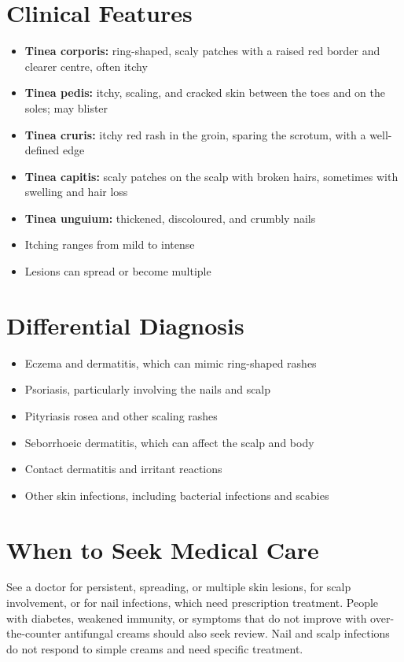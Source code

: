 \section*{Clinical Features}
\begin{itemize}
    \item \textbf{Tinea corporis:} ring-shaped, scaly patches with a raised red border and clearer centre, often itchy
    \item \textbf{Tinea pedis:} itchy, scaling, and cracked skin between the toes and on the soles; may blister
    \item \textbf{Tinea cruris:} itchy red rash in the groin, sparing the scrotum, with a well-defined edge
    \item \textbf{Tinea capitis:} scaly patches on the scalp with broken hairs, sometimes with swelling and hair loss
    \item \textbf{Tinea unguium:} thickened, discoloured, and crumbly nails
    \item Itching ranges from mild to intense
    \item Lesions can spread or become multiple
\end{itemize}

\section*{Differential Diagnosis}
\begin{itemize}
    \item Eczema and dermatitis, which can mimic ring-shaped rashes
    \item Psoriasis, particularly involving the nails and scalp
    \item Pityriasis rosea and other scaling rashes
    \item Seborrhoeic dermatitis, which can affect the scalp and body
    \item Contact dermatitis and irritant reactions
    \item Other skin infections, including bacterial infections and scabies
\end{itemize}

\section*{When to Seek Medical Care}
See a doctor for persistent, spreading, or multiple skin lesions, for scalp involvement, or for nail infections, which need prescription treatment. People with diabetes, weakened immunity, or symptoms that do not improve with over-the-counter antifungal creams should also seek review. Nail and scalp infections do not respond to simple creams and need specific treatment.

